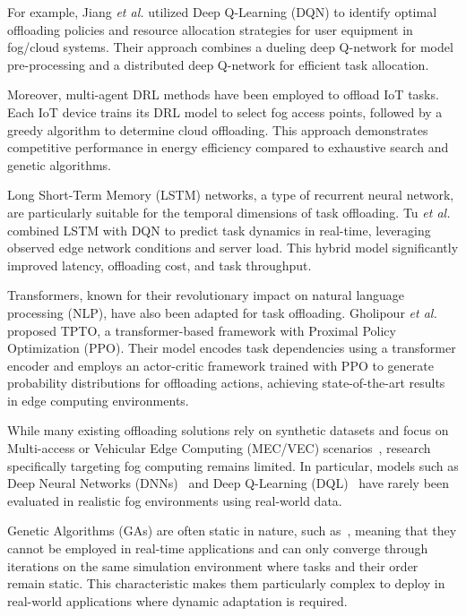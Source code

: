 \documentclass[preprint,3p,authoryear]{elsarticle}
\begin{document}
For example, Jiang \textit{et al.}\cite{jiang_reinforcement_2021} utilized Deep Q-Learning (DQN) to identify optimal offloading policies and resource allocation strategies for user equipment in fog/cloud systems. Their approach combines a dueling deep Q-network for model pre-processing and a distributed deep Q-network for efficient task allocation.

Moreover, multi-agent DRL methods\cite{ren_deep_2021} have been employed to offload IoT tasks. Each IoT device trains its DRL model to select fog access points, followed by a greedy algorithm to determine cloud offloading. This approach demonstrates competitive performance in energy efficiency compared to exhaustive search and genetic algorithms.

Long Short-Term Memory (LSTM) networks, a type of recurrent neural network, are particularly suitable for the temporal dimensions of task offloading. Tu \textit{et al.}\cite{tu_task_2022} combined LSTM with DQN to predict task dynamics in real-time, leveraging observed edge network conditions and server load. This hybrid model significantly improved latency, offloading cost, and task throughput.

Transformers, known for their revolutionary impact on natural language processing (NLP), have also been adapted for task offloading. Gholipour \textit{et al.}\cite{gholipour_tpto_2023} proposed TPTO, a transformer-based framework with Proximal Policy Optimization (PPO). Their model encodes task dependencies using a transformer encoder and employs an actor-critic framework trained with PPO to generate probability distributions for offloading actions, achieving state-of-the-art results in edge computing environments.

While many existing offloading solutions rely on synthetic datasets and focus on Multi-access or Vehicular Edge Computing (MEC/VEC) scenarios~\cite{fahimullah_review_2022, tu_task_2022, gholipour_tpto_2023}, research specifically targeting fog computing remains limited. In particular, models such as Deep Neural Networks (DNNs)~\cite{sarkar_deep_2022} and Deep Q-Learning (DQL)~\cite{jiang_reinforcement_2021} have rarely been evaluated in realistic fog environments using real-world data.

Genetic Algorithms (GAs) are often static in nature, such as~\citet{bernard_d-npga_2024, pakmehr_etfc_2024}, meaning that they cannot be employed in real-time applications and can only converge through iterations on the same simulation environment where tasks and their order remain static. This characteristic makes them particularly complex to deploy in real-world applications where dynamic adaptation is required.
\end{document}
